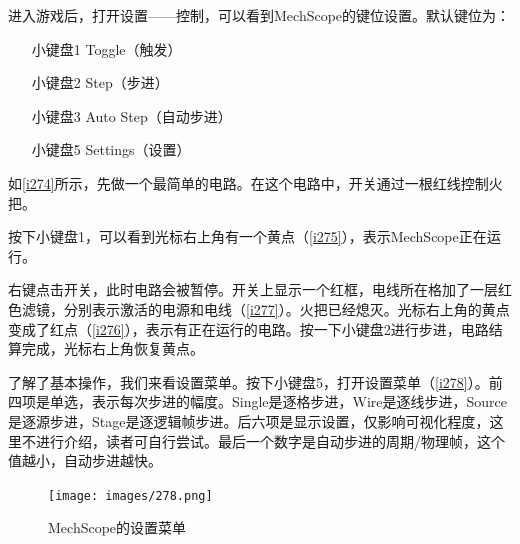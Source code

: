 进入游戏后，打开设置——控制，可以看到MechScope的键位设置。默认键位为：
\begin{itemize}
\item[小键盘1] Toggle（触发）
\item[小键盘2] Step（步进）
\item[小键盘3] Auto Step（自动步进）
\item[小键盘5] Settings（设置）
\end{itemize}

如\autoref{i274}所示，先做一个最简单的电路。在这个电路中，开关通过一根红线控制火把。
\begin{figure}[!ht]
\begin{center}
\qquad
{}
\end{center}
\caption{}
\end{figure}

按下小键盘1，可以看到光标右上角有一个黄点（\autoref{i275}），表示MechScope正在运行。
\begin{figure}[!ht]
\begin{center}
\qquad
{}
\end{center}
\caption{}
\end{figure}

右键点击开关，此时电路会被暂停。开关上显示一个红框，电线所在格加了一层红色滤镜，分别表示激活的电源和电线（\autoref{i277}）。火把已经熄灭。光标右上角的黄点变成了红点（\autoref{i276}），表示有正在运行的电路。按一下小键盘2进行步进，电路结算完成，光标右上角恢复黄点。

了解了基本操作，我们来看设置菜单。按下小键盘5，打开设置菜单（\autoref{i278}）。前四项是单选，表示每次步进的幅度。Single是逐格步进，Wire是逐线步进，Source是逐源步进，Stage是逐逻辑帧步进。后六项是显示设置，仅影响可视化程度，这里不进行介绍，读者可自行尝试。最后一个数字是自动步进的周期/物理帧，这个值越小，自动步进越快。
\begin{figure}
\centering
\texttt{[image: images/278.png]}
\caption{MechScope的设置菜单}\label{i278}
\end{figure}

